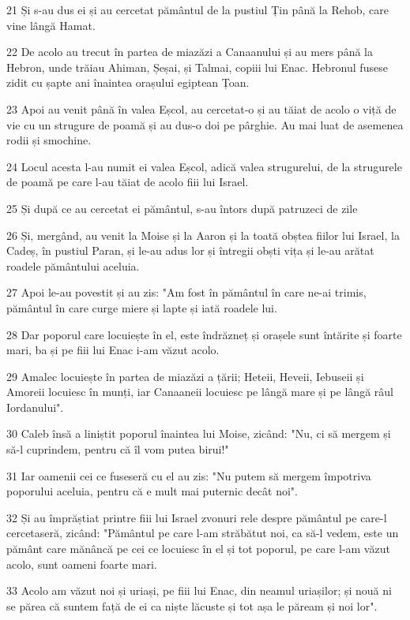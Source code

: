 \par 21 Și s-au dus ei și au cercetat pământul de la pustiul Țin până la Rehob, care vine lângă Hamat.
\par 22 De acolo au trecut în partea de miazăzi a Canaanului și au mers până la Hebron, unde trăiau Ahiman, Șeșai, și Talmai, copiii lui Enac. Hebronul fusese zidit cu șapte ani înaintea orașului egiptean Țoan.
\par 23 Apoi au venit până în valea Eșcol, au cercetat-o și au tăiat de acolo o viță de vie cu un strugure de poamă și au dus-o doi pe pârghie. Au mai luat de asemenea rodii și smochine.
\par 24 Locul acesta l-au numit ei valea Eșcol, adică valea strugurelui, de la strugurele de poamă pe care l-au tăiat de acolo fiii lui Israel.
\par 25 Și după ce au cercetat ei pământul, s-au întors după patruzeci de zile
\par 26 Și, mergând, au venit la Moise și la Aaron și la toată obștea fiilor lui Israel, la Cadeș, în pustiul Paran, și le-au adus lor și întregii obști vița și le-au arătat roadele pământului aceluia.
\par 27 Apoi le-au povestit și au zis: "Am fost în pământul în care ne-ai trimis, pământul în care curge miere și lapte și iată roadele lui.
\par 28 Dar poporul care locuiește în el, este îndrăzneț și orașele sunt întărite și foarte mari, ba și pe fiii lui Enac i-am văzut acolo.
\par 29 Amalec locuiește în partea de miazăzi a țării; Heteii, Heveii, Iebuseii și Amoreii locuiesc în munți, iar Canaaneii locuiesc pe lângă mare și pe lângă râul Iordanului".
\par 30 Caleb însă a liniștit poporul înaintea lui Moise, zicând: "Nu, ci să mergem și să-l cuprindem, pentru că îl vom putea birui!"
\par 31 Iar oamenii cei ce fuseseră cu el au zis: "Nu putem să mergem împotriva poporului aceluia, pentru că e mult mai puternic decât noi".
\par 32 Și au împrăștiat printre fiii lui Israel zvonuri rele despre pământul pe care-l cercetaseră, zicând: "Pământul pe care l-am străbătut noi, ca să-l vedem, este un pământ care mănâncă pe cei ce locuiesc în el și tot poporul, pe care l-am văzut acolo, sunt oameni foarte mari.
\par 33 Acolo am văzut noi și uriași, pe fiii lui Enac, din neamul uriașilor; și nouă ni se părea că suntem față de ei ca niște lăcuste și tot așa le păream și noi lor".

